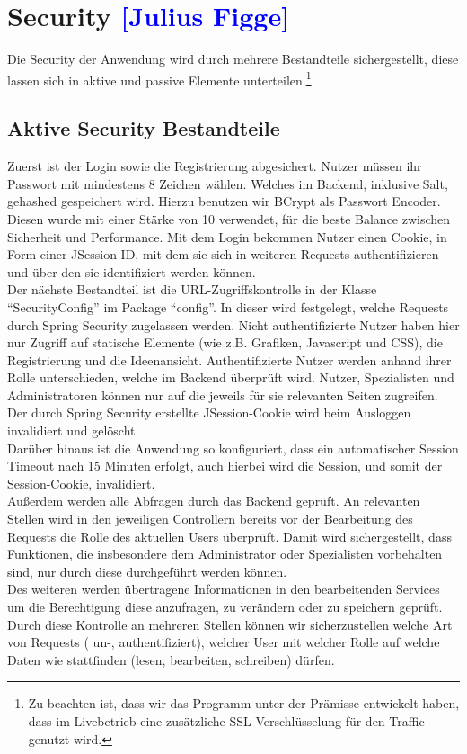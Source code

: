 

\section{Security  \textcolor{blue}{[Julius Figge]}}
\label{Security}

Die Security der Anwendung wird durch mehrere Bestandteile sichergestellt, diese lassen sich in aktive und passive Elemente unterteilen.\footnote{Zu beachten ist, dass wir das Programm unter der Prämisse entwickelt haben, dass im Livebetrieb eine zusätzliche SSL-Verschlüsselung für den Traffic genutzt wird.}

\subsection{Aktive Security Bestandteile}
Zuerst ist der Login sowie die Registrierung abgesichert. Nutzer müssen ihr Passwort mit mindestens 8 Zeichen wählen. Welches im Backend, inklusive Salt, gehashed gespeichert wird. Hierzu benutzen wir BCrypt als Passwort Encoder. Diesen wurde mit einer Stärke von 10 verwendet, für die beste Balance zwischen Sicherheit und Performance. Mit dem Login bekommen Nutzer einen Cookie, in Form einer JSession ID, mit dem sie sich in weiteren Requests authentifizieren und über den sie identifiziert werden können.\\
Der nächste Bestandteil ist die URL-Zugriffskontrolle in der Klasse \enquote{SecurityConfig} im Package \enquote{config}. In dieser wird festgelegt, welche Requests durch Spring Security zugelassen werden. Nicht authentifizierte Nutzer haben hier nur Zugriff auf statische Elemente (wie z.B. Grafiken, Javascript und CSS), die Registrierung und die Ideenansicht.
Authentifizierte Nutzer werden anhand ihrer Rolle unterschieden, welche im Backend überprüft wird. Nutzer, Spezialisten und Administratoren können nur auf die jeweils für sie relevanten Seiten zugreifen.
Der durch Spring Security erstellte JSession-Cookie wird beim Ausloggen invalidiert und gelöscht.\\
Darüber hinaus ist die Anwendung so konfiguriert, dass ein automatischer Session Timeout nach 15 Minuten erfolgt, auch hierbei wird die Session, und somit der Session-Cookie, invalidiert.\\
Außerdem werden alle Abfragen durch das Backend geprüft. An relevanten Stellen wird in den jeweiligen Controllern bereits vor der Bearbeitung des Requests die Rolle des aktuellen Users überprüft. Damit wird sichergestellt, dass Funktionen, die insbesondere dem Administrator oder Spezialisten vorbehalten sind, nur durch diese durchgeführt werden können. \\
Des weiteren werden übertragene Informationen in den bearbeitenden Services um die Berechtigung diese anzufragen, zu verändern oder zu speichern geprüft.\\
Durch diese Kontrolle an mehreren Stellen können wir sicherzustellen welche Art von Requests ( un-, authentifiziert), welcher User mit welcher Rolle auf welche Daten wie stattfinden (lesen, bearbeiten, schreiben) dürfen.\\

